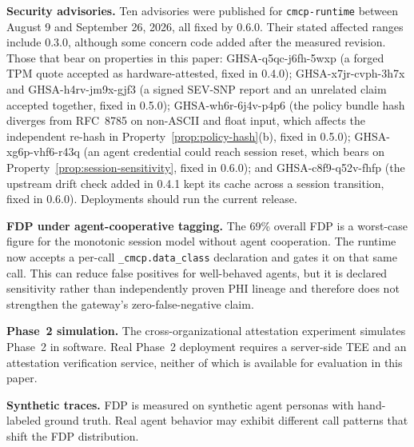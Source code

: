\textbf{Security advisories.} Ten advisories were published for \texttt{cmcp-runtime}
between August 9 and September 26, 2026, all fixed by 0.6.0. Their stated affected ranges
include 0.3.0, although some concern code added after the measured revision. Those that
bear on properties in this paper: GHSA-q5qc-j6fh-5wxp (a forged TPM quote accepted as
hardware-attested, fixed in 0.4.0); GHSA-x7jr-cvph-3h7x and GHSA-h4rv-jm9x-gjf3 (a signed
SEV-SNP report and an unrelated claim accepted together, fixed in 0.5.0);
GHSA-wh6r-6j4v-p4p6 (the policy bundle hash diverges from RFC~8785 on non-ASCII and float
input, which affects the independent re-hash in Property~\ref{prop:policy-hash}(b), fixed
in 0.5.0); GHSA-xg6p-vhf6-r43q (an agent credential could reach session reset, which bears
on Property~\ref{prop:session-sensitivity}, fixed in 0.6.0); and GHSA-c8f9-q52v-fhfp (the
upstream drift check added in 0.4.1 kept its cache across a session transition, fixed in
0.6.0). Deployments should run the current release.

\textbf{FDP under agent-cooperative tagging.} The 69\% overall FDP is a worst-case figure
for the monotonic session model without agent cooperation. The runtime now accepts a per-call
\texttt{\_cmcp.data\_class} declaration and gates it on that same call. This can reduce false
positives for well-behaved agents, but it is declared sensitivity rather than independently
proven PHI lineage and therefore does not strengthen the gateway's zero-false-negative claim.

\textbf{Phase~2 simulation.} The cross-organizational attestation experiment simulates
Phase~2 in software. Real Phase~2 deployment requires a server-side TEE and an attestation
verification service, neither of which is available for evaluation in this paper.

\textbf{Synthetic traces.} FDP is measured on synthetic agent personas with hand-labeled
ground truth. Real agent behavior may exhibit different call patterns that shift the FDP
distribution.
